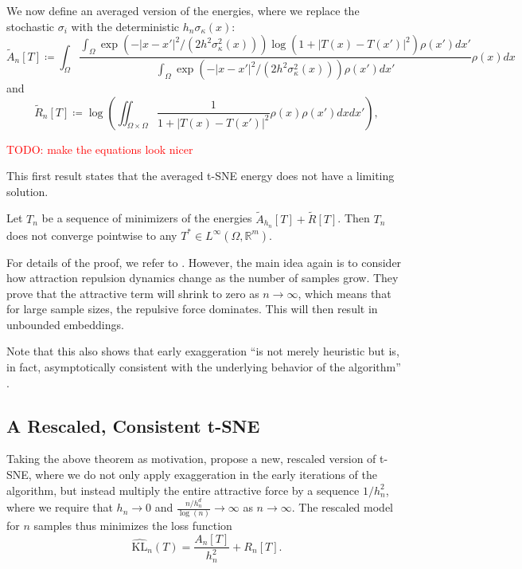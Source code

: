 We now define an averaged version of the energies, where we replace the stochastic $\sigma_i$ with the deterministic $h_n \sigma_\kappa(x)$: 
\begin{equation*}
    \tilde{A}_n[T] \coloneq  \int_{\Omega} \frac{\int_{\Omega} \exp(-|x - x'|^2/(2 h^2 \sigma_\kappa^2(x))) \log(1+ |T(x) - T(x')|^2) \rho(x')dx'}{\int_{\Omega} \exp(-|x - x'|^2/(2 h^2 \sigma_\kappa^2(x))) \rho(x')dx'} \rho(x)dx  
\end{equation*}
and 
\begin{equation*}
    \tilde{R}_n[T] \coloneq \log \left( \iint_{\Omega \times \Omega} \frac{1}{1+ |T(x) - T(x')|^2} \rho(x) \rho(x')dx dx' \right), 
\end{equation*}

\textcolor{red}{TODO: make the equations look nicer}

This first result states that the averaged t-SNE energy does not have a limiting solution. 
\begin{thm}
    Let $T_n$ be a sequence of minimizers of the energies $\tilde{A}_{h_n}[T] + \tilde{R}[T]$. Then $T_n$ does not converge pointwise to any $T^* \in L^\infty(\Omega, \mathbb{R}^m)$. 
\end{thm}

For details of the proof, we refer to \cite{murray2024largedatalimitsscaling}. However, the main idea again is to consider how attraction repulsion dynamics change as the number of samples grow. 
They prove that the attractive term will shrink to zero as $n \to \infty$, which means that for large sample sizes, the repulsive force dominates. This will then result in unbounded embeddings. 

Note that this also shows that early exaggeration \enquote{is not merely heuristic but is, in fact, asymptotically consistent with the underlying behavior of the algorithm} \cite{murray2024largedatalimitsscaling}.

\subsection*{A Rescaled, Consistent t-SNE}
Taking the above theorem as motivation, \cite{murray2024largedatalimitsscaling} propose a new, rescaled version of t-SNE, where we do not only apply exaggeration in the early iterations of the algorithm, but instead multiply the entire attractive force by a sequence $1/h_n^2$, where we  require that $h_n \to 0$ and $\frac{n /h_n^d}{\log(n)} \to \infty$ as $n \to \infty$. 
The rescaled model for $n$ samples thus minimizes the loss function 
\begin{equation}
    \hat{\text{KL}}_n(T) = \frac{A_n [T]}{h_n^2} + R_n[T].
\end{equation}

